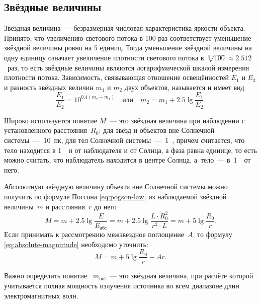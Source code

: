\subsection{Звёздные величины}
Звёздная величина~--- безразмерная числовая характеристика яркости объекта. Принято, что увеличению светового потока в 100 раз соответствует уменьшение звёздной величины ровно на 5 единиц. Тогда уменьшение звёздной величины на одну единицу означает увеличение плотности светового потока в $\sqrt[5]{100}\approx 2.512$~раз, то есть звёздные величины являются логарифмической шкалой измерения плотности потока. Зависимость, связывающая отношение освещённостей $E_1$ и $E_2$ и разность звёздных величин $m_1$ и $m_2$ двух объектов, называется  и имеет вид
\begin{equation}
    \frac{E_1}{E_2} = 10^{0.4(m_2 - m_1)} \quad \text{или} \quad m_2 = m_1 + 2.5 \lg \frac{E_1}{E_2}.
    \label{eq:pogson-law}
\end{equation}

Широко используется понятие  $M$~--- это звёздная величина при наблюдении с установленного расстояния~$R_0$: для звёзд и объектов вне Солнечной системы~---~10~пк, для тел Солнечной системы~---~1~\au, причем считается, что тело находится в 1~\au~и от наблюдателя и от Солнца, а фаза равна единице, то есть можно считать, что наблюдатель находится в центре Солнца, а~тело~--- в~1~\au~от него.

Абсолютную звёздную величину объекта вне Солнечной системы можно получить по формуле Погсона \eqref{eq:pogson-law} из наблюдаемой звёздной величины~$m$ и расстояния~$r$ до него
\begin{equation}
    M = m + 2.5 \lg \frac{E}{E_\text{абс}} = m + 2.5 \lg \frac{L \cdot R_0^2}{r^2 \cdot L} = m + 5 \lg \frac{R_0}{r}.
    \label{eq:absolute-magnutude}
\end{equation}
Если принимать к рассмотрению межзвездное поглощение~$A$, то формулу  \eqref{eq:absolute-magnutude} необходимо уточнить:
\begin{equation}
    M = m + 5 \lg \frac{R_0}{r} - Ar.
\end{equation}

Важно определить понятие ~$m_\text{bol}$~--- это звёздная величина, при расчёте которой учитывается полная мощность излучения источника во всем диапазоне длин электромагнитных волн.

